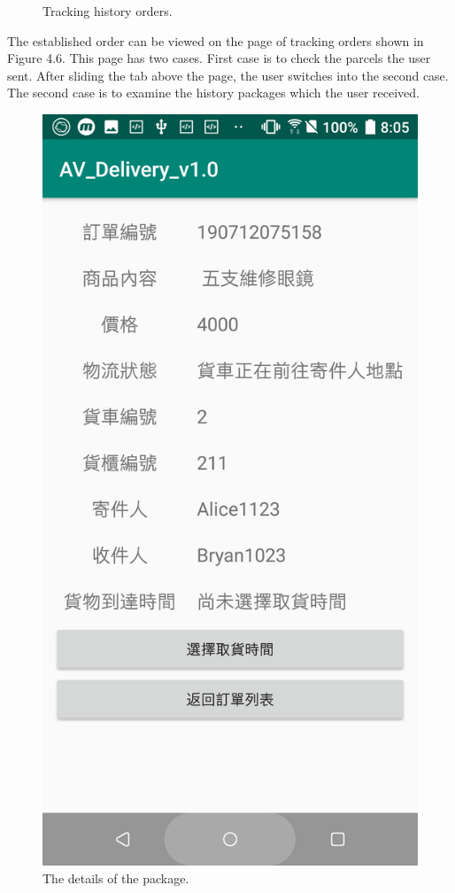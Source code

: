\documentclass[12pt]{ksthesis}
\begin{document}
\begin{thesis}
{\begin{figure}[H]
\caption{Tracking history orders.}
\label{Tracking_history_orders}
\end{figure}

The established order can be viewed on the page of tracking orders shown in Figure 4.6.  This page has two cases. First case is to check the parcels the user sent. After sliding the tab above the page, the user switches into the second case. The second case is to examine the history packages which the user received.

\begin{figure}[H]
\centering
\includegraphics[scale=0.125]{./figures/F4-7-Details_package.PNG}
\caption{\large The details of the package.}
\vspace{0.5cm}
\label{Fig:details_of_package}
\end{figure} 


}
\end{thesis}
\end{document}
